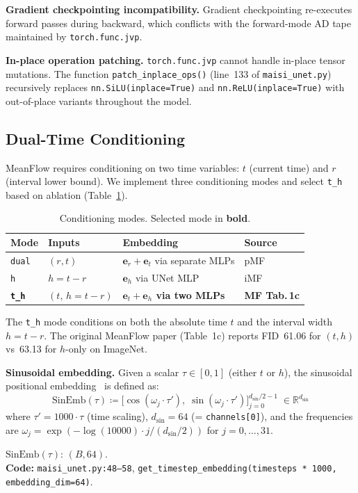 \documentclass[11pt,a4paper]{article}
\newcommand{\code}[1]{\texttt{#1}}
\begin{document}
\textbf{Gradient checkpointing incompatibility.}  Gradient checkpointing
re-executes forward passes during backward, which conflicts with the
forward-mode AD tape maintained by \code{torch.func.jvp}.

\textbf{In-place operation patching.}  \code{torch.func.jvp} cannot handle
in-place tensor mutations.  The function \code{patch\_inplace\_ops()} (line~133
of \code{maisi\_unet.py}) recursively replaces \code{nn.SiLU(inplace=True)}
and \code{nn.ReLU(inplace=True)} with out-of-place variants throughout the
model.

\subsection{Dual-Time Conditioning}

MeanFlow requires conditioning on two time variables: $t$ (current time) and
$r$ (interval lower bound).  We implement three conditioning modes and select
\code{t\_h} based on ablation (Table~\ref{tab:conditioning}).

\begin{table}[ht]
\centering
\caption{Conditioning modes.  Selected mode in \textbf{bold}.}
\label{tab:conditioning}
\begin{tabular}{llll}
\toprule
\textbf{Mode} & \textbf{Inputs} & \textbf{Embedding} & \textbf{Source} \\
\midrule
\code{dual} & $(r,t)$ & $\mathbf{e}_r+\mathbf{e}_t$ via separate MLPs & pMF \\
\code{h}    & $h=t{-}r$ & $\mathbf{e}_h$ via UNet MLP & iMF \\
\textbf{\code{t\_h}} & \textbf{$(t,\,h{=}t{-}r)$} & \textbf{$\mathbf{e}_t + \mathbf{e}_h$ via two MLPs} & \textbf{MF Tab.\,1c} \\
\bottomrule
\end{tabular}
\end{table}

The \code{t\_h} mode conditions on both the absolute time $t$ and the interval
width $h = t-r$.  The original MeanFlow paper (Table~1c) reports FID~61.06
for $(t,h)$ vs~63.13 for $h$-only on ImageNet.

\textbf{Sinusoidal embedding.}  Given a scalar $\tau \in [0,1]$ (either $t$ or
$h$), the sinusoidal positional embedding~\cite{ddpm} is defined as:
\begin{equation}
  \mathrm{SinEmb}(\tau)
    \coloneqq \bigl[\cos(\omega_j \cdot \tau'),\;\sin(\omega_j \cdot \tau')\bigr]_{j=0}^{d_\mathrm{sin}/2-1}
    \;\in \mathbb{R}^{d_\mathrm{sin}}
  \label{eq:sin_emb}
\end{equation}
where $\tau' = 1000 \cdot \tau$ (time scaling), $d_\mathrm{sin} = 64$ (=
\code{channels[0]}), and the frequencies are
$\omega_j = \exp(-\log(10000) \cdot j / (d_\mathrm{sin}/2))$ for
$j = 0, \ldots, 31$.
\begin{shapes}
$\mathrm{SinEmb}(\tau)$: $(B, 64)$.\\
\textbf{Code:} \code{maisi\_unet.py:48--58},
\code{get\_timestep\_embedding(timesteps * 1000, embedding\_dim=64)}.
\end{shapes}
\end{document}

